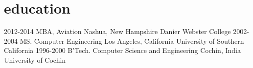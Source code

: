 \section{education}

\begin{entrylist}
  \entry
    {2012-2014}
    {MBA, Aviation}
    {Nashua, New Hampshire}
    {Danier Webster College}
  \entry
    {2002-2004}
    {MS. Computer Engineering}
    {Los Angeles, California}
    {University of Southern California}
  \entry
    {1996-2000}
    {B'Tech. Computer Science and Engineering}
    {Cochin, India}
    {University of Cochin}
\end{entrylist}
